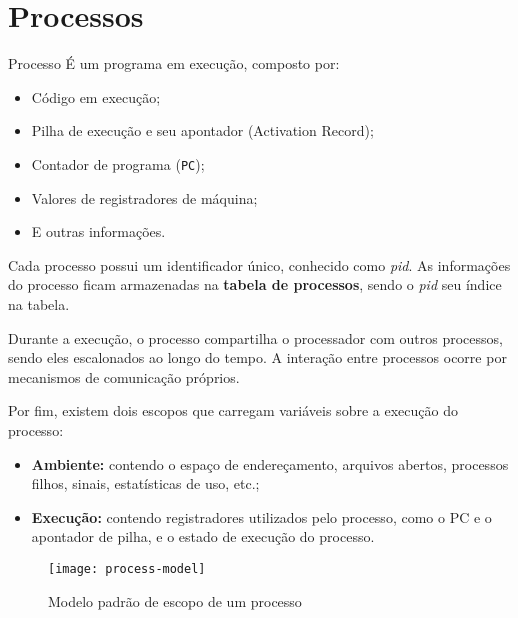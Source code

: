 \chapter{Processos}

\begin{definicao}{Processo}
  É um programa em execução, composto por:
  \begin{itemize}
    \item Código em execução;
    \item Pilha de execução e seu apontador (Activation Record);
    \item Contador de programa (\texttt{PC});
    \item Valores de registradores de máquina;
    \item E outras informações.
  \end{itemize}
\end{definicao}

Cada processo possui um identificador único, conhecido como \textit{pid}. As informações do processo ficam armazenadas na \textbf{tabela de processos}, sendo o \textit{pid} seu índice na tabela.

Durante a execução, o processo compartilha o processador com outros processos, sendo eles escalonados ao longo do tempo. A interação entre processos ocorre por mecanismos de comunicação próprios.

Por fim, existem dois escopos que carregam variáveis sobre a execução do processo:

\begin{itemize}
  \item \textbf{Ambiente:} contendo o espaço de endereçamento, arquivos abertos, processos filhos, sinais, estatísticas de uso, etc.;

  \item \textbf{Execução:} contendo registradores utilizados pelo processo, como o PC e o apontador de pilha, e o estado de execução do processo.
\end{itemize}

\begin{figure}
  \centering
  \texttt{[image: process-model]}
  \caption{Modelo padrão de escopo de um processo}
  \label{fig:process-model}
\end{figure}
















